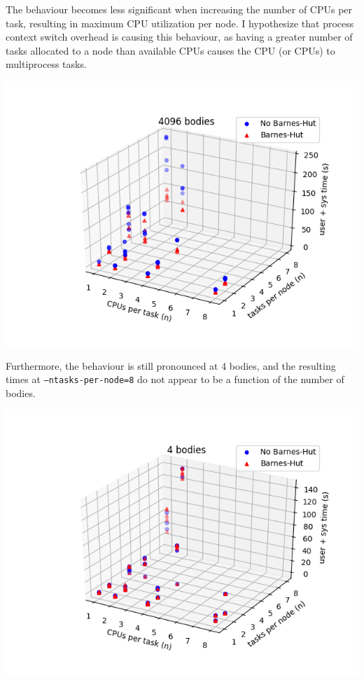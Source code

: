 \documentclass[11pt,a4paper]{article}
\begin{document}
The behaviour becomes less significant when increasing the number of CPUs per task, resulting in maximum CPU utilization per node. I hypothesize that process context switch overhead is causing this behaviour, as having a greater number of tasks allocated to a node than available CPUs causes the CPU (or CPUs) to multiprocess tasks. 

\includegraphics[width=14.2cm]{4096-cpusPerTask-tasksPerNode}

Furthermore, the behaviour is still pronounced at 4 bodies, and the resulting times at \texttt{--ntasks-per-node=8} do not appear to be a function of the number of bodies.

\includegraphics[width=14.2cm]{4-cpusPerTask-tasksPerNode}
\end{document}
